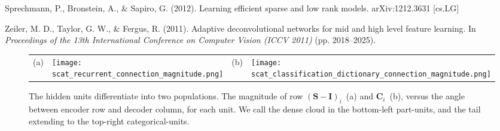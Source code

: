\documentclass{article} %
\newcommand{\C}{\mathbf{C}}
\newcommand{\I}{\mathbf{I}}
\newcommand{\Sm}{\mathbf{S}}
\begin{document}
\begin{thebibliography}{100}
Sprechmann, P., Bronstein, A., \& Sapiro, G. (2012).
\newblock Learning efficient sparse and low rank models.
\newblock arXiv:1212.3631 [cs.LG]




Zeiler, M. D., Taylor, G. W., \& Fergus, R. (2011).
\newblock Adaptive deconvolutional networks for mid and high level feature learning.
\newblock In \emph{Proceedings of the 13th International Conference on Computer Vision (ICCV 2011)} (pp. 2018--2025).


\end{thebibliography}


\appendix

\begin{figure}[p] %
  \begin{center}
    \begin{tabular}{p{0.04in}p{2.4in}p{0.04in}p{2.4in}}
      \parbox[b]{0in}{(a) \vspace{3.8cm}} & \texttt{[image: scat\_recurrent\_connection\_magnitude.png]} &
      \parbox[b]{0in}{(b) \vspace{3.8cm}} & \texttt{[image: scat\_classification\_dictionary\_connection\_magnitude.png]} 
    \end{tabular}
  \end{center}
  \caption{The hidden units differentiate into two populations.  The magnitude of row $\left( \Sm - \I \right)_i$~(a) and $\C_i$~(b), versus the angle between encoder row and decoder column, for each unit.  We call the dense cloud in the bottom-left part-units, and the tail extending to the top-right categorical-units. \label{two_classes_figure}}
\end{figure}
\end{document}
